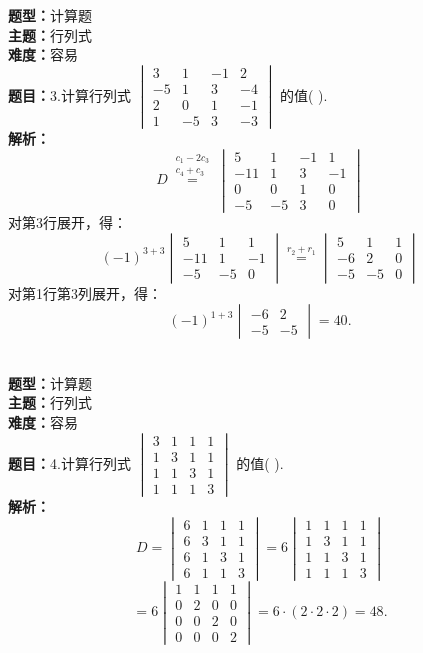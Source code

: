 \documentclass{ctexart}
\newenvironment{question}[5]{%
	\noindent\textbf{题型：}#1\\
	\textbf{主题：}#2\\
	\textbf{难度：}#3\\
	\textbf{题目：}#4\\
	\textbf{解析：}#5\\
	\vspace{1em}
}{}
\begin{document}
	\begin{question}
		{计算题}
		{行列式}
		{容易}
		{3.计算行列式 \(\begin{vmatrix}3 & 1 & -1 & 2 \\ -5 & 1 & 3 & -4 \\ 2 & 0 & 1 & -1 \\ 1 & -5 & 3 & -3\end{vmatrix}\) 的值(  ).}
		{
			\[
			D \stackrel{\substack{c_1-2c_3 \\ c_4+c_3}}{=}
			\begin{vmatrix}
				5 & 1 & -1 & 1 \\
				-11 & 1 & 3 & -1 \\
				0 & 0 & 1 & 0 \\
				-5 & -5 & 3 & 0
			\end{vmatrix}
			\]
			对第3行展开，得：
			\[
			(-1)^{3+3}\begin{vmatrix}
				5 & 1 & 1 \\
				-11 & 1 & -1 \\
				-5 & -5 & 0
			\end{vmatrix} \stackrel{r_2+r_1}{=}
			\begin{vmatrix}
				5 & 1 & 1 \\
				-6 & 2 & 0 \\
				-5 & -5 & 0
			\end{vmatrix}
			\]
			对第1行第3列展开，得：
			\[
			(-1)^{1+3} \begin{vmatrix}
				-6 & 2 \\
				-5 & -5
			\end{vmatrix} = 40.
			\]}
	\end{question}
	
	
	\begin{question}
		{计算题}
		{行列式}
		{容易}
		{4.计算行列式 \(\begin{vmatrix}3 & 1 & 1 & 1 \\ 1 & 3 & 1 & 1 \\ 1 & 1 & 3 & 1 \\ 1 & 1 & 1 & 3\end{vmatrix}\) 的值(  ).}
		{
			\[
			D = \begin{vmatrix}
				6 & 1 & 1 & 1 \\
				6 & 3 & 1 & 1 \\
				6 & 1 & 3 & 1 \\
				6 & 1 & 1 & 3
			\end{vmatrix} = 6
			\begin{vmatrix}
				1 & 1 & 1 & 1 \\
				1 & 3 & 1 & 1 \\
				1 & 1 & 3 & 1 \\
				1 & 1 & 1 & 3
			\end{vmatrix}
			\]
			\[
			= 6
			\begin{vmatrix}
				1 & 1 & 1 & 1 \\
				0 & 2 & 0 & 0 \\
				0 & 0 & 2 & 0 \\
				0 & 0 & 0 & 2
			\end{vmatrix} = 6 \cdot (2 \cdot 2 \cdot 2) = 48.
			\]}
	\end{question}
	
\end{document}
